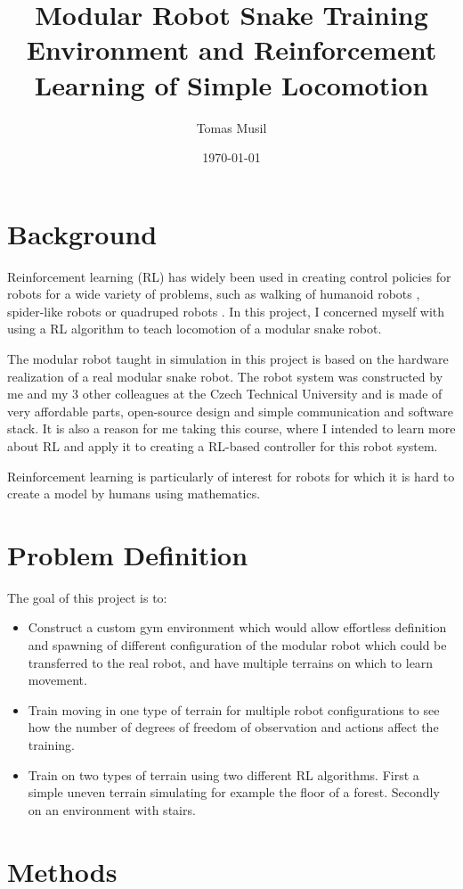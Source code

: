 \documentclass{article}
\author{Tomas Musil}
\date{\today}
\title{Modular Robot Snake Training Environment and Reinforcement Learning of Simple Locomotion}
\begin{document}
\maketitle

\section{Background}
Reinforcement learning (RL) has widely been used in creating control policies for robots for a wide variety of problems, such as walking of humanoid robots \cite{ppo}, spider-like robots \cite{emergence} or quadruped robots \cite{massively}.
In this project, I concerned myself with using a RL algorithm to teach locomotion of a modular snake robot.

The modular robot taught in simulation in this project is based on the hardware realization of a real modular snake robot.
The robot system was constructed by me and my 3 other colleagues at the Czech Technical University and is made of very affordable parts, open-source design and simple communication and software stack.
It is also a reason for me taking this course, where I intended to learn more about RL and apply it to creating a RL-based controller for this robot system.

Reinforcement learning is particularly of interest for robots for which it is hard to create a model by humans using mathematics. 


\section{Problem Definition}
The goal of this project is to:
\begin{itemize}
    \item Construct a custom gym environment which would allow effortless definition and spawning of different configuration of the modular robot which could be transferred to the real robot, and have multiple terrains on which to learn movement.
    \item Train moving in one type of terrain for multiple robot configurations to see how the number of degrees of freedom of observation and actions affect the training.
    \item Train on two types of terrain using two different RL algorithms. First a simple uneven terrain simulating for example the floor of a forest.
      Secondly on an environment with stairs.
\end{itemize}

\section{Methods}
\end{document}
